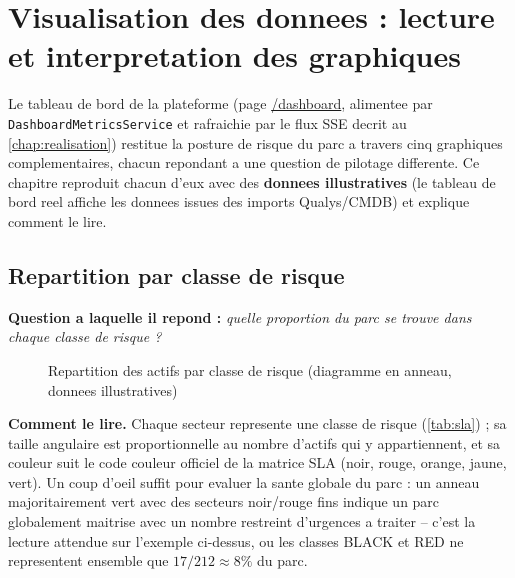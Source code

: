 \chapter{Visualisation des donnees : lecture et interpretation des graphiques}
\label{chap:visualisation}

Le tableau de bord de la plateforme (page \url{/dashboard}, alimentee par
\texttt{Dashboard\-Metrics\-Service} et rafraichie par le flux SSE decrit au
\cref{chap:realisation}) restitue la posture de risque du parc a travers cinq
graphiques complementaires, chacun repondant a une question de pilotage differente.
Ce chapitre reproduit chacun d'eux avec des \textbf{donnees illustratives} (le
tableau de bord reel affiche les donnees issues des imports Qualys/CMDB) et explique
comment le lire.

\section{Repartition par classe de risque}

\textbf{Question a laquelle il repond :} \emph{quelle proportion du parc se trouve
dans chaque classe de risque ?}

\begin{figure}[H]
\centering
{}
\caption{Repartition des actifs par classe de risque (diagramme en anneau, donnees illustratives)}
\label{fig:chart-class}
\end{figure}

\textbf{Comment le lire.} Chaque secteur represente une classe de risque
(\cref{tab:sla}) ; sa taille angulaire est proportionnelle au nombre d'actifs qui y
appartiennent, et sa couleur suit le code couleur officiel de la matrice SLA (noir,
rouge, orange, jaune, vert). Un coup d'oeil suffit pour evaluer la sante globale du
parc : un anneau majoritairement vert avec des secteurs noir/rouge fins indique un
parc globalement maitrise avec un nombre restreint d'urgences a traiter -- c'est la
lecture attendue sur l'exemple ci-dessus, ou les classes BLACK et RED ne
representent ensemble que $17/212\approx 8\%$ du parc.

